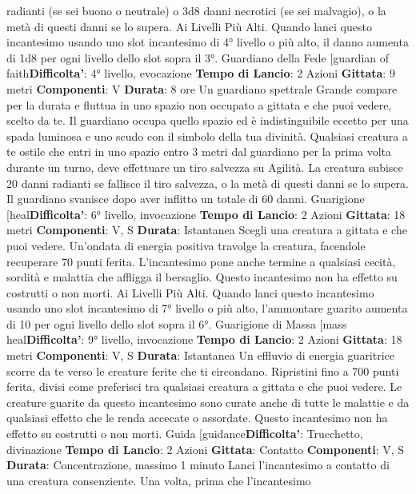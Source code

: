\begin{multicols}{2}
radianti (se sei buono o neutrale) o 3d8 danni necrotici
(se sei malvagio), o la metà di questi danni se lo
supera.
Ai Livelli Più Alti. Quando lanci questo incantesimo
usando uno slot incantesimo di 4° livello o più alto, il
danno aumenta di 1d8 per ogni livello dello slot sopra il
3°.
Guardiano della Fede
[guardian of faith\textbf{Difficolta'}:
4° livello, evocazione
\textbf{Tempo di Lancio}: 2 Azioni
\textbf{Gittata}: 9 metri
\textbf{Componenti}: V
\textbf{Durata}: 8 ore
Un guardiano spettrale Grande compare per la durata e
fluttua in uno spazio non occupato a gittata e che puoi
vedere, scelto da te. Il guardiano occupa quello spazio
ed è indistinguibile eccetto per una spada luminosa e
uno scudo con il simbolo della tua divinità.
Qualsiasi creatura a te ostile che entri in uno spazio
entro 3 metri dal guardiano per la prima volta durante
un turno, deve effettuare un tiro salvezza su Agilità.
La creatura subisce 20 danni radianti se fallisce il tiro
salvezza, o la metà di questi danni se lo supera. Il
guardiano svanisce dopo aver inflitto un totale di 60
danni.
Guarigione
[heal\textbf{Difficolta'}:
6° livello, invocazione
\textbf{Tempo di Lancio}: 2 Azioni
\textbf{Gittata}: 18 metri
\textbf{Componenti}: V, S
\textbf{Durata}: Istantanea
Scegli una creatura a gittata e che puoi vedere.
Un’ondata di energia positiva travolge la creatura,
facendole recuperare 70 punti ferita. L’incantesimo
pone anche termine a qualsiasi cecità, sordità e
malattia che affligga il bersaglio. Questo incantesimo
non ha effetto su costrutti o non morti.
Ai Livelli Più Alti. Quando lanci questo incantesimo
usando uno slot incantesimo di 7° livello o più alto,
l’ammontare guarito aumenta di 10 per ogni livello dello
slot sopra il 6°.
Guarigione di Massa
[mass heal\textbf{Difficolta'}:
9° livello, invocazione
\textbf{Tempo di Lancio}: 2 Azioni
\textbf{Gittata}: 18 metri
\textbf{Componenti}: V, S
\textbf{Durata}: Istantanea
Un effluvio di energia guaritrice scorre da te verso le
creature ferite che ti circondano. Ripristini fino a 700
punti ferita, divisi come preferisci tra qualsiasi creatura
a gittata e che puoi vedere. Le creature guarite da
questo incantesimo sono curate anche di tutte le
malattie e da qualsiasi effetto che le renda accecate o
assordate. Questo incantesimo non ha effetto su
costrutti o non morti.
Guida
[guidance\textbf{Difficolta'}:
Trucchetto, divinazione
\textbf{Tempo di Lancio}: 2 Azioni
\textbf{Gittata}: Contatto
\textbf{Componenti}: V, S
\textbf{Durata}: Concentrazione, massimo 1 minuto
Lanci l’incantesimo a contatto di una creatura
consenziente. Una volta, prima che l’incantesimo

\end{multicols}
